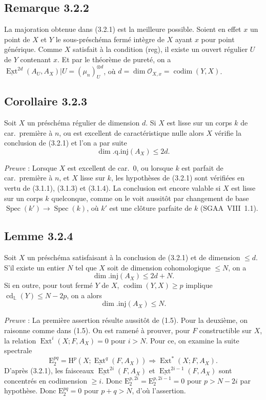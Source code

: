 \documentclass[11pt]{article}
\DeclareMathOperator{\codim}{codim}
\providecommand{\cO}{\mathcal{O}}
\renewcommand{\H}{\mathrm{H}}
\DeclareMathOperator{\Ext}{Ext}
\DeclareMathOperator{\Spec}{Spec}
\DeclareMathOperator{\cd}{cd}
\newcommand{\E}{\mathrm{E}}
\providecommand{\Spec}{\operatorname{Spec}}
\providecommand{\Spec}{\operatorname{Spec}}
\providecommand{\Spec}{\operatorname{Spec}}
\providecommand{\Spec}{\operatorname{Spec}}
\begin{document}
\subsection*{Remarque 3.2.2}
La majoration obtenue dans (3.2.1) est la meilleure possible. Soient en effet $x$ un point de $X$ et $Y$ le sous-préschéma fermé intègre de $X$ ayant $x$ pour point générique. Comme $X$ satisfait à la condition (reg), il existe un ouvert régulier $U$ de $Y$
contenant $x$. Et par le théorème de 
pureté, on a $\underline{\Ext}^{2d}(A_U, A_X)|U = (\mu_n)^{\otimes d}_U$, où $d = \dim \cO_{X,x} = \codim(Y,X)$.

\subsection*{Corollaire 3.2.3}
Soit $X$ un préschéma régulier de dimension $d$. Si $X$ est lisse sur un corps $k$ de car.~première à $n$, ou est excellent de caractéristique nulle alors $X$ vérifie la conclusion de (3.2.1) et l'on a par suite
\[
\dim.\mathrm{q.inj}(A_X) \leqslant 2d.
\]

\emph{Preuve} : Lorsque $X$ est excellent de car.~0, ou lorsque $k$ est parfait de car.~première à $n$, et $X$ lisse sur $k$, les hypothèses de (3.2.1) sont vérifiées en vertu de (3.1.1), (3.1.3) et (3.1.4). La conclusion est encore valable si $X$ est lisse sur un corps $k$ quelconque, comme on le voit aussitôt par changement de base $\Spec(k') \to \Spec(k)$, où $k'$ est une clôture parfaite de $k$ (SGAA~VIII~1.1).

\subsection*{Lemme 3.2.4}
Soit $X$ un préschéma satisfaisant à la conclusion de (3.2.1) et de dimension $\leqslant d$. S'il existe un entier $N$ tel que $X$ soit de dimension cohomologique $\leqslant N$, on a
\[
\dim.\mathrm{inj}(A_X) \leqslant 2d + N.
\]
Si en outre, pour tout fermé $Y$ de $X$, $\codim(Y,X) \geqslant p$ implique $\cd_{\mathbb{L}}(Y) \leqslant N - 2p$, on a alors
\[
\dim.\mathrm{inj}(A_X) \leqslant N.
\]

\emph{Preuve} : La première assertion résulte aussitôt de (1.5). Pour la deuxième, on raisonne comme dans (1.5). On est ramené à prouver, pour $F$ constructible sur $X$, la relation $\Ext^i(X; F, A_X) = 0$ pour $i > N$. Pour ce, on examine la suite spectrale
\[
\E_2^{pq} = \H^p(X; \underline{\Ext}^q(F, A_X)) \Rightarrow \Ext^{*}(X; F, A_X).
\]
D'après (3.2.1), les
faisceaux $\underline{\Ext}^{2i}(F, A_X)$ et $\underline{\Ext}^{2i-1}(F, A_X)$ sont concentrés en codimension $\geqslant i$. Donc $\E_2^{p,2i} = \E_2^{p,2i-1} = 0$ pour $p > N - 2i$ par hypothèse. Donc $\E_2^{pq} = 0$ pour $p+q > N$, d'où l'assertion.
\end{document}
